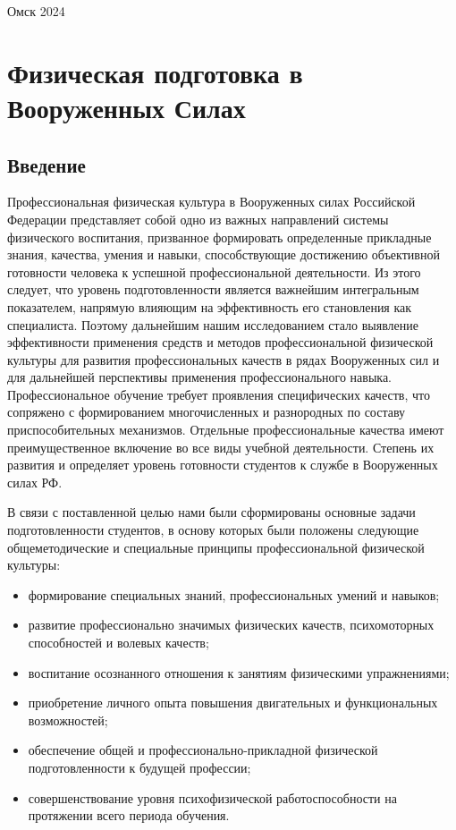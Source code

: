 \documentclass[a4paper]{article}
\begin{document}
    \vspace*{\fill}
    \begin{center}
        Омск 2024
    \end{center}

    \newpage

    \tableofcontents

    \newpage

    \section{Физическая подготовка в Вооруженных Силах}

    \subsection{Введение}

    Профессиональная физическая культура в Вооруженных силах Российской Федерации представляет собой одно из важных направлений системы физического воспитания, призванное формировать определенные прикладные знания, качества, умения и навыки, способствующие достижению объективной готовности человека к успешной профессиональной деятельности. Из этого следует, что уровень подготовленности является важнейшим интегральным показателем, напрямую влияющим на эффективность его становления как специалиста. Поэтому дальнейшим нашим исследованием стало выявление эффективности применения средств и методов профессиональной физической культуры для развития профессиональных качеств в рядах Вооруженных сил и для дальнейшей перспективы применения профессионального навыка. Профессиональное обучение требует проявления специфических качеств, что сопряжено с формированием многочисленных и разнородных по составу приспособительных механизмов. Отдельные профессиональные качества имеют преимущественное включение во все виды учебной деятельности. Степень их развития и определяет уровень готовности студентов к службе в Вооруженных силах РФ.

    В связи с поставленной целью нами были сформированы основные задачи подготовленности студентов, в основу которых были положены следующие общеметодические и специальные принципы профессиональной физической культуры:

    \begin{itemize}
        \item формирование специальных знаний, профессиональных умений и навыков;
        \item развитие профессионально значимых физических качеств, психомоторных способностей и волевых качеств;
        \item воспитание осознанного отношения к занятиям физическими упражнениями;
        \item приобретение личного опыта повышения двигательных и функциональных возможностей;
        \item обеспечение общей и профессионально-прикладной физической подготовленности к будущей профессии;
        \item совершенствование уровня психофизической работоспособности на протяжении всего периода обучения.
    \end{itemize}
\end{document}
